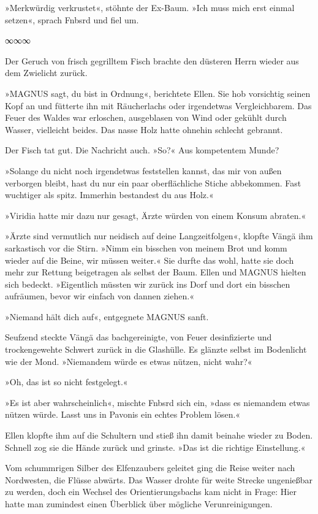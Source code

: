»Merkwürdig verkrustet«, stöhnte der Ex-Baum. »Ich muss mich erst einmal setzen«, sprach Fnbsrd und fiel um.

\begin{center}
∞∞∞
\end{center}

Der Geruch von frisch gegrilltem Fisch brachte den düsteren Herrn wieder aus dem Zwielicht zurück.

»MAGNUS sagt, du bist in Ordnung«, berichtete Ellen. Sie hob vorsichtig seinen Kopf an und fütterte ihn mit Räucherlachs oder irgendetwas Vergleichbarem. Das Feuer des Waldes war erloschen, ausgeblasen von Wind oder gekühlt durch Wasser, vielleicht beides. Das nasse Holz hatte ohnehin schlecht gebrannt.

Der Fisch tat gut. Die Nachricht auch. »So?« Aus kompetentem Munde?

»Solange du nicht noch irgendetwas feststellen kannst, das mir von außen verborgen bleibt, hast du nur ein paar oberflächliche Stiche abbekommen. Fast wuchtiger als spitz. Immerhin bestandest du aus Holz.«

»Viridia hatte mir dazu nur gesagt, Ärzte würden von einem Konsum abraten.«

»Ärzte sind vermutlich nur neidisch auf deine Langzeitfolgen«, klopfte Vängä ihm sarkastisch vor die Stirn. »Nimm ein bisschen von meinem Brot und komm wieder auf die Beine, wir müssen weiter.« Sie durfte das wohl, hatte sie doch mehr zur Rettung beigetragen als selbst der Baum. Ellen und MAGNUS hielten sich bedeckt. »Eigentlich müssten wir zurück ins Dorf und dort ein bisschen aufräumen, bevor wir einfach von dannen ziehen.«

»Niemand hält dich auf«, entgegnete MAGNUS sanft.

Seufzend steckte Vängä das bachgereinigte, von Feuer desinfizierte und trockengewehte Schwert zurück in die Glashülle. Es glänzte selbst im Bodenlicht wie der Mond. »Niemandem würde es etwas nützen, nicht wahr?«

»Oh, das ist so nicht festgelegt.«

»Es ist aber wahrscheinlich«, mischte Fnbsrd sich ein, »dass es niemandem etwas nützen würde. Lasst uns in Pavonis ein echtes Problem lösen.«

Ellen klopfte ihm auf die Schultern und stieß ihn damit beinahe wieder zu Boden. Schnell zog sie die Hände zurück und grinste. »Das ist die richtige Einstellung.«

Vom schummrigen Silber des Elfenzaubers geleitet ging die Reise weiter nach Nordwesten, die Flüsse abwärts. Das Wasser drohte für weite Strecke ungenießbar zu werden, doch ein Wechsel des Orientierungsbachs kam nicht in Frage: Hier hatte man zumindest einen Überblick über mögliche Verunreinigungen.

